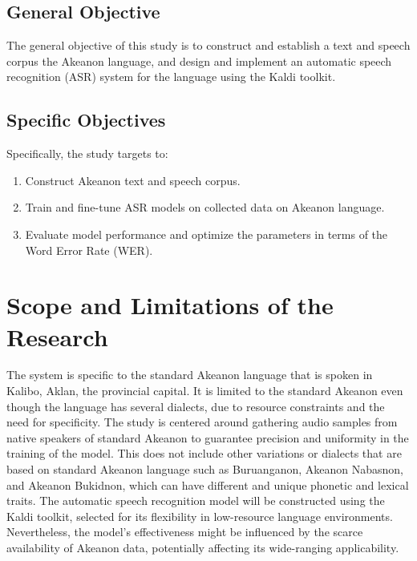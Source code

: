 \subsection{General Objective}
\label{sec:generalobjective}

The general objective of this study is to construct and establish a text and speech corpus the Akeanon language, and design and implement an automatic speech recognition (ASR) system for the language using the Kaldi toolkit.


\subsection{Specific Objectives}
\label{sec:specificobjectives}

Specifically, the study targets to:
\begin{enumerate}
    \item Construct Akeanon text and speech corpus.
    \item Train and fine-tune ASR models on collected data on Akeanon language.
    \item Evaluate model performance and optimize the parameters in terms of the Word Error Rate (WER).
 \end{enumerate}
 
\section{Scope and Limitations of the Research}
\label{sec:scopelimitations}

The system is specific to the standard Akeanon language that is spoken in Kalibo, Aklan, the provincial capital. It is limited to the standard Akeanon even though the language has several dialects, due to resource constraints and the need for specificity. The study is centered around gathering audio samples from native speakers of standard Akeanon to guarantee precision and uniformity in the training of the model. This does not include other variations or dialects that are based on standard Akeanon language such as Buruanganon, Akeanon Nabasnon, and Akeanon Bukidnon, which can have different and unique phonetic and lexical traits. The automatic speech recognition model will be constructed using the Kaldi toolkit, selected for its flexibility in low-resource language environments. Nevertheless, the model's effectiveness might be influenced by the scarce availability of Akeanon data, potentially affecting its wide-ranging applicability.

